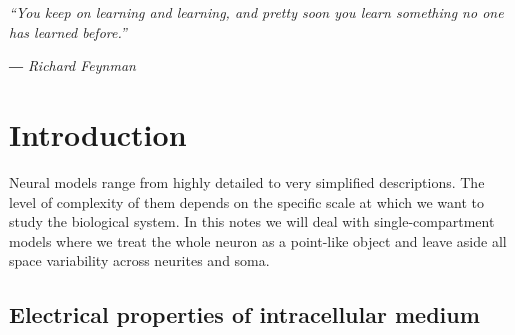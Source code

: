 \documentclass[titlepage]{article}
\renewcommand{\headrulewidth}{0pt} %
\begin{document}
\renewcommand{\headrulewidth}{1pt}
\pagestyle{fancy}{\rhead{\color{brown!60!black}{\Large\Coffeecup}}}
\rfoot{\thepage}
\thispagestyle{fancy}

\textit{“You keep on learning and learning, and pretty soon you learn something no one has learned before.”}
	 
\hfill \textit{― Richard Feynman}

\section{Introduction}

Neural models range from highly detailed to very simplified descriptions. The level of complexity of them depends on the specific scale at which we want to study the biological system. In this notes we will deal with single-compartment models where we treat the whole neuron as a point-like object and leave aside all space variability across neurites and soma.

\subsection{Electrical properties of intracellular medium}
\end{document}
